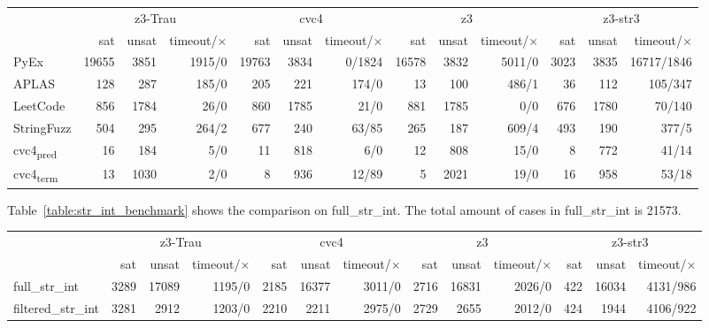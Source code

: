 \begin{table*}[]
\centering
\caption{Results of z3-Trau, cvc4, and z3 on string benchmarks}
\begin{tabular}{l | r r r | r r r | r r r | r r r}
\hline
\multirow{2}{*}{}   & \multicolumn{3}{|c|}{z3-Trau} & \multicolumn{3}{|c}{cvc4} & \multicolumn{3}{|c}{z3} & \multicolumn{3}{|c}{z3-str3} \\
			& sat & unsat & timeout/$\times$ & sat & unsat & timeout/$\times$ & sat & unsat & timeout/$\times$ & sat & unsat & timeout/$\times$ \\ \hline
PyEx		& 19655 & 3851 & 1915/0 & 19763 & 3834 & 0/1824 & 16578 & 3832 & 5011/0 & 3023 & 3835 & 16717/1846 \\ 
APLAS		&   128 &  287 &  185/0 & 205 &  221 & 174/0 &  13 &  100 & 486/1 & 36 & 112 & 105/347 \\ 
LeetCode	&   856 & 1784 &   26/0 & 860 & 1785 &  21/0 & 881 & 1785 & 0/0 & 676 & 1780 &  70/140 \\ 
StringFuzz	& 504 & 295 & 264/2 & 677 & 240 & 63/85 & 265 & 187 & 609/4 & 493 & 190 & 377/5 \\ 
cvc4\textsubscript{pred}	& 16 & 184 & 5/0 & 11 & 818 & 6/0 & 12 & 808 & 15/0 & 8 & 772 & 41/14 \\ 
cvc4\textsubscript{term}	& 13 & 1030 & 2/0 & 8 & 936 & 12/89 & 5 & 2021 & 19/0 & 16 & 958 & 53/18 \\ \hline
\end{tabular}
\label{table:base_benchmark}
\end{table*}

Table~\ref{table:str_int_benchmark} shows the comparison on full\_str\_int. The total amount of cases in full\_str\_int is 21573.
\begin{table*}[]
\centering
\caption{Results of z3-Trau, cvc4, and z3 on str\_int benchmark}
\begin{tabular}{l | r r r | r r r | r r r | r r r}
\hline
\multirow{2}{*}{}   & \multicolumn{3}{|c|}{z3-Trau} & \multicolumn{3}{|c}{cvc4} & \multicolumn{3}{|c}{z3} & \multicolumn{3}{|c}{z3-str3} \\
			& sat & unsat & timeout/$\times$ & sat & unsat & timeout/$\times$ & sat & unsat & timeout/$\times$ & sat & unsat & timeout/$\times$ \\ \hline
full\_str\_int		& 3289 & 17089 & 1195/0 & 2185 & 16377 & 3011/0 & 2716 & 16831 & 2026/0 & 422 & 16034 & 4131/986 \\ 
filtered\_str\_int	& 3281 & 2912 & 1203/0 & 2210 & 2211 & 2975/0 & 2729 & 2655 & 2012/0 & 424 & 1944 & 4106/922 \\ \hline
\end{tabular}
\label{table:str_int_benchmark}
\end{table*}



